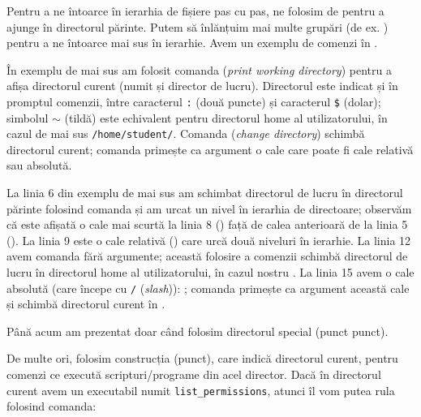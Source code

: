 Pentru a ne întoarce în ierarhia de fișiere pas cu pas, ne folosim de  pentru a ajunge în directorul părinte.
Putem să înlănțuim mai multe grupări  (de ex. ) pentru a ne întoarce mai sus în ierarhie.
Avem un exemplu de comenzi în .


În exemplu de mai sus am folosit comanda  (\textit{print working directory}) pentru a afișa directorul curent (numit și director de lucru).
Directorul este indicat și în promptul comenzii, între caracterul \texttt{:} (două puncte) și caracterul \texttt{\$} (dolar);
simbolul \texttt{$\sim$} (tildă) este echivalent pentru directorul home al utilizatorului, în cazul de mai sus \texttt{/home/student/}.
Comanda  (\textit{change directory}) schimbă directorul curent;
comanda primește ca argument o cale care poate fi cale relativă sau absolută.

La linia 6 din exemplu de mai sus am schimbat directorul de lucru în directorul părinte folosind comanda  și am urcat un nivel în ierarhia de directoare;
observăm că este afișată o cale mai scurtă la linia 8 () față de calea anterioară de la linia 5 ().
La linia 9 este o cale relativă () care urcă două niveluri în ierarhie.
La linia 12 avem comanda  fără argumente;
această folosire a comenzii schimbă directorul de lucru în directorul home al utilizatorului, în cazul nostru .
La linia 15 avem o cale absolută (care începe cu \texttt{/} (\textit{slash})): ;
comanda  primește ca argument această cale și schimbă directorul curent în .

Până acum am prezentat doar când folosim directorul special  (punct punct).

De multe ori, folosim construcția  (punct), care indică directorul curent, pentru comenzi ce execută scripturi/programe din acel director.
Dacă în directorul curent avem un executabil numit \texttt{list\_permissions}, atunci îl vom putea rula folosind comanda:


